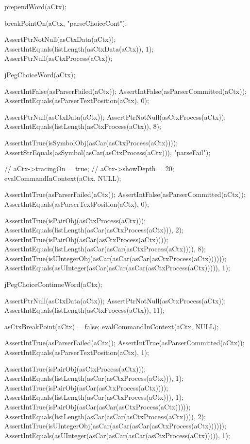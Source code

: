   prependWord(aCtx);
  
  breakPointOn(aCtx, "parseChoiceCont");

  AssertPtrNotNull(asCtxData(aCtx));
  AssertIntEquals(listLength(asCtxData(aCtx)), 1);
  AssertPtrNull(asCtxProcess(aCtx));
  
  jPegChoiceWord(aCtx);
  
  AssertIntFalse(asParserFailed(aCtx));
  AssertIntFalse(asParserCommitted(aCtx));
  AssertIntEquals(asParserTextPosition(aCtx), 0);
  
  AssertPtrNull(asCtxData(aCtx));
  AssertPtrNotNull(asCtxProcess(aCtx));
  AssertIntEquals(listLength(asCtxProcess(aCtx)), 8);
  
  AssertIntTrue(isSymbolObj(asCar(asCtxProcess(aCtx))));
  AssertStrEquals(asSymbol(asCar(asCtxProcess(aCtx))), "parseFail");
  
//  aCtx->tracingOn = true;
//  aCtx->showDepth = 20;
  evalCommandInContext(aCtx, NULL);
  
  AssertIntTrue(asParserFailed(aCtx));
  AssertIntFalse(asParserCommitted(aCtx));
  AssertIntEquals(asParserTextPosition(aCtx), 0);
  
  AssertIntTrue(isPairObj(asCtxProcess(aCtx)));
  AssertIntEquals(listLength(asCar(asCtxProcess(aCtx))), 2);
  AssertIntTrue(isPairObj(asCar(asCtxProcess(aCtx))));
  AssertIntEquals(listLength(asCar(asCar(asCtxProcess(aCtx)))), 8);
  AssertIntTrue(isUIntegerObj(asCar(asCar(asCar(asCtxProcess(aCtx))))));
  AssertIntEquals(asUInteger(asCar(asCar(asCar(asCtxProcess(aCtx))))), 1);
  
  jPegChoiceContinueWord(aCtx);
  
  AssertPtrNull(asCtxData(aCtx));
  AssertPtrNotNull(asCtxProcess(aCtx));
  AssertIntEquals(listLength(asCtxProcess(aCtx)), 11);
  
  asCtxBreakPoint(aCtx) = false;
  evalCommandInContext(aCtx, NULL);  
  
  AssertIntTrue(asParserFailed(aCtx));
  AssertIntTrue(asParserCommitted(aCtx));
  AssertIntEquals(asParserTextPosition(aCtx), 1);
  
  AssertIntTrue(isPairObj(asCtxProcess(aCtx)));
  AssertIntEquals(listLength(asCar(asCtxProcess(aCtx))), 1);
  AssertIntTrue(isPairObj(asCar(asCtxProcess(aCtx))));
  AssertIntEquals(listLength(asCar(asCtxProcess(aCtx))), 1);
  AssertIntTrue(isPairObj(asCar(asCar(asCtxProcess(aCtx)))));
  AssertIntEquals(listLength(asCar(asCar(asCtxProcess(aCtx)))), 2);
  AssertIntTrue(isUIntegerObj(asCar(asCar(asCar(asCtxProcess(aCtx))))));
  AssertIntEquals(asUInteger(asCar(asCar(asCar(asCtxProcess(aCtx))))), 1);
  
